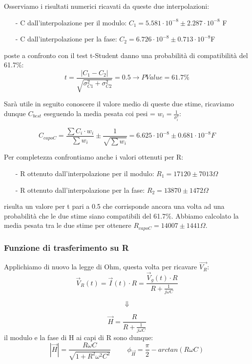 \documentclass{article}
\theoremstyle{definition}
\begin{document}
\noindent Osserviamo i risultati numerici ricavati da queste due interpolazioni:
\begin{enumerate}
    \item[-] C dall'interpolazione per il modulo: \(C_{1} = 5.581 \cdot 10^{-8} \pm 2.287 \cdot 10^{-8}\) F
    \item[-] C dall'interpolazione per la fase: \(C_{2} = 6.726 \cdot 10^{-8} \pm 0.713 \cdot 10^{-8} \)F
\end{enumerate}
poste a confronto con il test t-Student danno una probabilità di compatibilità del 61.7\%:
\[t = \frac{\left| C_{1} - C_{2} \right|}{\sqrt{\sigma^{2}_{C1} + \sigma^{2}_{C2}}} = 0.5 \rightarrow PValue = 61.7\%\]

\noindent Sarà utile in seguito conoscere il valore medio di queste due stime, ricaviamo dunque \(C_{best}\) eseguendo la media pesata coi pesi = \(w_{i} = \frac{1}{\sigma^{2}_{i}}\):

\[C_{capoC} = \frac{\sum{C_{i} \cdot w_{i}}}{\sum{w_{i}}}\pm \frac{1}{\sqrt{\sum{w_{i}}}} = 6.625 \cdot 10^{-8} \pm 0.681 \cdot 10^{-8} F\]

\noindent Per completezza confrontiamo anche i valori ottenuti per R:
\begin{enumerate}
    \item[-] R ottenuto dall'interpolazione per il modulo: \(R_{1} = 17120 \pm 7013 \Omega \)
    \item[-] R ottenuto dall'interpolazione per la fase: \(R_{2} = 13870 \pm 1472 \Omega\)
\end{enumerate}

risulta un valore per t pari a 0.5 che corrisponde ancora una volta ad una probabilità che le due stime siano compatibili del 61.7\%. Abbiamo calcolato la media pesata tra le due stime per ottenere \(R_{capoC} =  14007 \pm  1441\Omega\).

\subsubsection{Funzione di trasferimento su R}
Applichiamo di nuovo la legge di Ohm, questa volta per ricavare \(\vec{V_{R}}\):
\[\vec{V}_{R}(t) = \vec{I}(t) \cdot R = \frac{\vec{V}_{g}(t) \cdot R}{R + \frac{1}{j\omega C}}\]

\[\Downarrow\]

\[\vec{H} = \frac{R}{R +\frac{1}{j\omega C}}\]
il modulo e la fase di H ai capi di R sono dunque:
\[\left| \vec{H} \right| = \frac{R \omega C}{\sqrt{1 + R^2 \omega^2 C^2}} \hspace{1cm} \phi_{\vec{H}} = \frac{\pi }{2} - arctan(R \omega C)\]
\end{document}
